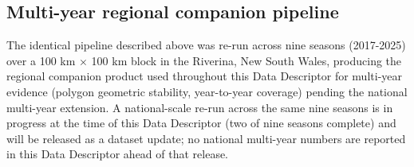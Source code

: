 \subsection*{Multi-year regional companion pipeline}\label{multi-year-regional-companion-pipeline}

The identical pipeline described above was re-run across nine seasons (2017-2025) over a 100 km $\times$ 100 km block in the Riverina, New South Wales, producing the regional companion product used throughout this Data Descriptor for multi-year evidence (polygon geometric stability, year-to-year coverage) pending the national multi-year extension. A national-scale re-run across the same nine seasons is in progress at the time of this Data Descriptor (two of nine seasons complete) and will be released as a dataset update; no national multi-year numbers are reported in this Data Descriptor ahead of that release.
